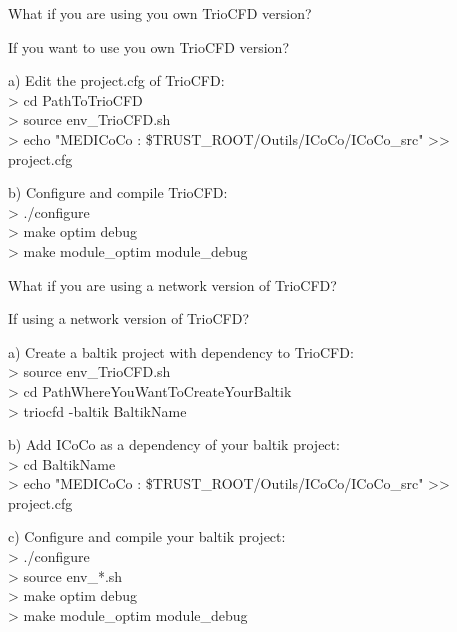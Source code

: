 \documentclass[10pt, hyperref={unicode=true,pdfusetitle, bookmarks=true,bookmarksnumbered=false,bookmarksopen=false, breaklinks=false,pdfborder={0 0 1},backref=true,colorlinks=true,linkcolor=darkblue,pageanchor, urlcolor=darkblue}]{beamer}
\begin{document}
\begin{frame}{What if you are using you own TrioCFD version?}

\begin{block}{If you want to use you own TrioCFD version?}

a) Edit the project.cfg of TrioCFD:\\
    > cd PathToTrioCFD \\
    > source env\_TrioCFD.sh \\
    > echo "MEDICoCo : \$TRUST\_ROOT/Outils/ICoCo/ICoCo\_src" >> project.cfg
\end{block}

\begin{block}{}
b) Configure and compile TrioCFD:\\
> ./configure \\
> make optim debug \\
> make module\_optim module\_debug
\end{block}

\end{frame}
\begin{frame}{What if you are using a network version of TrioCFD?}

\begin{block}{If using a network version of TrioCFD?}

a) Create a baltik project with dependency to TrioCFD:\\
    > source env\_TrioCFD.sh \\
    > cd PathWhereYouWantToCreateYourBaltik\\
    > triocfd -baltik BaltikName \\
\end{block}

\begin{block}{}
b) Add ICoCo as a dependency of your baltik project:\\
    > cd BaltikName \\
    > echo "MEDICoCo : \$TRUST\_ROOT/Outils/ICoCo/ICoCo\_src" >> project.cfg
\end{block}

\begin{block}{}
c) Configure and compile your baltik project:\\
> ./configure \\
> source env\_*.sh \\
> make optim debug \\
> make module\_optim module\_debug
\end{block}
\end{frame}
\end{document}
